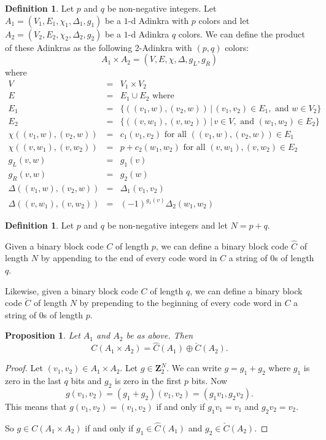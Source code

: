 \documentclass[12pt,twoside,singlespace]{article}
\numberwithin{equation}{section}
\newtheorem{prop}[equation]{Proposition}
\theoremstyle{definition}
\newtheorem{definition}[equation]{Definition}
\newcommand{\ZZ}{\mathbf{Z}}
\begin{document}
\begin{definition}
Let $p$ and $q$ be non-negative integers.  Let $A_1=(V_1, E_1, \chi_1, \Delta_1,g_1)$ be a $1$-d Adinkra with $p$ colors and let $A_2=(V_2, E_2, \chi_2, \Delta_2,g_2)$ be a $1$-d Adinkra $q$ colors.  We can define the product of these Adinkras as the following 2-Adinkra with $(p,q)$ colors:
\[A_1\times A_2=(V,E,\chi,\Delta,g_L,g_R)\]
where
\begin{eqnarray*}
V&=&V_1\times V_2\\
E&=&E_1\cup E_2\mbox{ where}\\
E_1&=&\{((v_1,w),(v_2,w))\,|\,(v_1, v_2)\in E_1,\mbox{ and } w\in V_2\}\\
E_2&=&\{((v,w_1),(v,w_2))\,|\,v\in V, \mbox{ and }(w_1,w_2)\in E_2\}\\
\chi((v_1,w),(v_2,w))&=&c_1(v_1,v_2)\mbox{ for all $((v_1,w),(v_2,w))\in E_1$}\\
\chi((v,w_1),(v,w_2))&=&p+c_2(w_1,w_2)\mbox{ for all $(v,w_1),(v,w_2)\in E_2$}\\
g_L(v,w)&=&g_1(v)\\
g_R(v,w)&=&g_2(w)\\
\Delta((v_1,w),(v_2,w))&=&\Delta_1(v_1,v_2)\\
\Delta((v,w_1),(v,w_2))&=&(-1)^{g_1(v)}\Delta_2(w_1,w_2)
\end{eqnarray*}
\end{definition}

\begin{definition}
Let $p$ and $q$ be non-negative integers and let $N=p+q$.

Given a binary block code $C$ of length $p$, we can define a binary block code $\hat{C}$ of length $N$ by appending to the end of every code word in $C$ a string of $0$s of length $q$.

Likewise, given a binary block code $C$ of length $q$, we can define a binary block code $\check{C}$ of length $N$ by prepending to the beginning of every code word in $C$ a string of $0$s of length $p$.
\end{definition}

\begin{prop}
Let $A_1$ and $A_2$ be as above.  Then
\[C(A_1\times A_2)=\hat{C}(A_1)\oplus \check{C}(A_2).\]
\end{prop}
\begin{proof}
Let $(v_1,v_2)\in A_1\times A_2$.  Let $g\in \ZZ_2^N$.  We can write $g=g_1+g_2$ where $g_1$ is zero in the last $q$ bits and $g_2$ is zero in the first $p$ bits.  Now
\[g(v_1,v_2)=(g_1+g_2)(v_1,v_2)=(g_1v_1,g_2v_2).\]
This means that $g(v_1,v_2)=(v_1,v_2)$ if and only if $g_1v_1=v_1$ and $g_2 v_2=v_2$.

So $g\in C(A_1\times A_2)$ if and only if $g_1\in \hat{C}(A_1)$ and $g_2\in \check{C}(A_2)$.
\end{proof}
\end{document}
